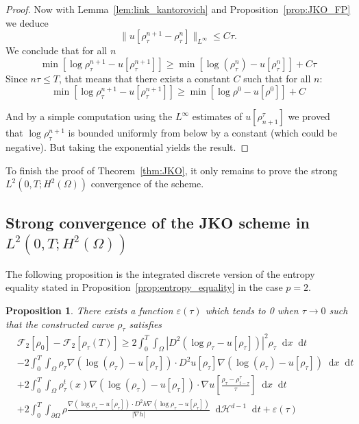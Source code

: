 \documentclass[a4paper,twosided, 11pt]{article}
\newcommand{\eps}{\varepsilon}
\newcommand {\f}   {\frac}
\newcommand {\p}   {\partial}
\theoremstyle{plain}
\newtheorem{proposition}[thm]{Proposition}
\theoremstyle{remark}
\newcommand{\diff}{\mathop{}\!\mathrm{d}}
\numberwithin{equation}{section}
\begin{document}
\begin{proof}
Now with Lemma~\ref{lem:link_kantorovich} and Proposition~\ref{prop:JKO_FP} we deduce
$$
\|u[\rho^{n+1}_{\tau}-\rho^{n}_{\tau}]\|_{L^{\infty}}\le C\tau. 
$$
We conclude that  for all $n$
$$
\min [\log\rho^{n+1}_{\tau} -u[\rho^{n+1}_{\tau}]] \ge \min[\log(\rho^{n}_{\tau}) - u[\rho^{n}_{\tau}]] + C\tau
$$
Since $n\tau\le T$, that means that there exists a constant $C$ such that for all $n$:
$$
\min [\log\rho^{n+1}_{\tau} - u[\rho^{n+1}_{\tau}]] \ge \min [\log\rho^{0}-u[\rho^{0}]]+C 
$$

And by a simple computation using the $L^{\infty}$ estimates of $u[\rho_{n+1}^{\tau}]$ we proved that $\log\rho^{n+1}_{\tau}$ is bounded uniformly from below by a constant (which could be negative). But taking the exponential yields the result. 

\end{proof}

To finish the proof of Theorem~\ref{thm:JKO}, it only remains to prove the strong $L^{2}(0,T; H^{2}(\Omega))$ convergence of the scheme.

\subsection{Strong convergence of the JKO scheme in $L^{2}(0,T; H^{2}(\Omega))$}

The following proposition is the integrated discrete version of the entropy equality stated in Proposition~\ref{prop:entropy_equality} in the case $p=2$.

\begin{proposition}\label{prop:L^2H^2bound}
There exists a function $\eps(\tau)$ which tends to 0 when $\tau\to 0$ such that the constructed curve $\rho_{\tau}$ satisfies
\begin{align*}
 &\mathcal{F}_{2}[\rho_{0}] -  \mathcal{F}_{2}[\rho_{\tau}(T)]\ge 2\int_{0}^{T}\int_{\Omega} |D^{2}(\log \rho_{\tau}-u[\rho_\tau])|^2\rho_{\tau}\diff x \diff t \\
 &- 2 \int_{0}^{T}\int_{\Omega}\rho_{\tau}  \nabla(\log(\rho_{\tau}) - u[\rho_{\tau}])\cdot D^{2}u[\rho_{\tau}]\nabla(\log(\rho_{\tau})-u[\rho_{\tau}])\diff x\diff t\\
 & + 2 \int_{0}^{T}\int_{\Omega}\rho_{\tau}^{t}(x)\nabla(\log(\rho_{\tau})-u[\rho_{\tau}])\cdot\nabla u\left[ \f{\rho_{\tau}-\rho_{t-\tau}^{\tau}}{\tau}\right]\diff x \diff t \\
 &+ 2\int_{0}^{T}\int_{\p\Omega}\rho \f{\nabla (\log \rho_{\tau}- u[\rho_{\tau}])\cdot D^{2} h \nabla (\log \rho_{\tau}- u[\rho_{\tau}])}{|\nabla h|}\diff \mathcal{H}^{d-1}\diff t + \eps(\tau)
\end{align*}
\end{proposition}
\end{document}
